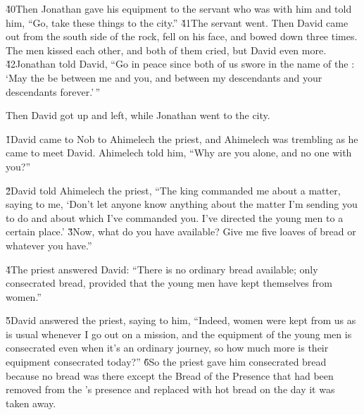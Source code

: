 \v{40}Then Jonathan gave his equipment to the servant who was with him and told him, ``Go, take these things to the city.'' \v{41}The servant went. Then David came out from the south side of the rock, fell on his face, and bowed down three times. The men kissed each other, and both of them cried, but David even more. \v{42}Jonathan told David, ``Go in peace since both of us swore in the name of the : `May the  be between me and you, and between my descendants and your descendants forever.'\,''

Then David got up and left, while Jonathan went to the city.

\v{1}David came to Nob to Ahimelech the priest, and Ahimelech was trembling as he came to meet David. Ahimelech told him, ``Why are you alone, and no one with you?''

\v{2}David told Ahimelech the priest, ``The king commanded me about a matter, saying to me, `Don't let anyone know anything about the matter I'm sending you to do and about which I've commanded you. I've directed the young men to a certain place.' \v{3}Now, what do you have available? Give me five loaves of bread or whatever you have.''

\v{4}The priest answered David: ``There is no ordinary bread available; only consecrated bread, provided that the young men have kept themselves from women.''

\v{5}David answered the priest, saying to him, ``Indeed, women were kept from us as is usual whenever I go out on a mission, and the equipment of the young men is consecrated even when it's an ordinary journey, so how much more is their equipment consecrated today?'' \v{6}So the priest gave him consecrated bread because no bread was there except the Bread of the Presence that had been removed from the 's presence and replaced with hot bread on the day it was taken away.

